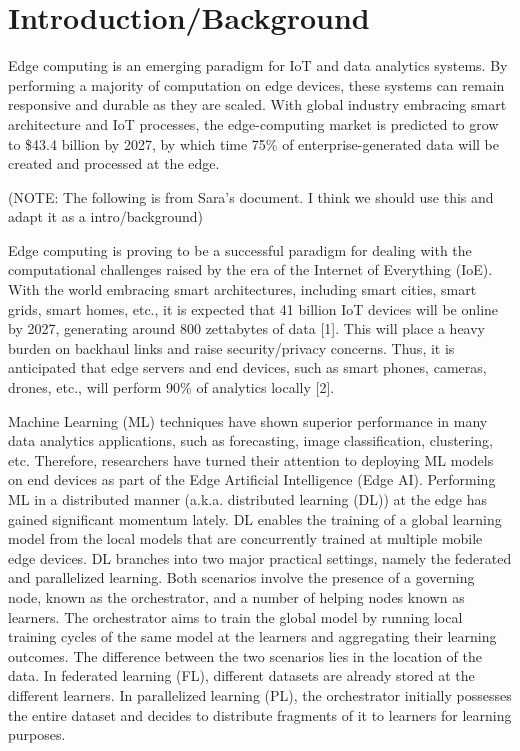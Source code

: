 \documentclass[../mthe-493-project-proposal.tex]{subfiles}
\begin{document}
    \chapter{Introduction/Background}
    \label{ch:introduction}
    
    Edge computing is an emerging paradigm for IoT and data analytics systems. By performing a majority of computation on edge devices, these systems can remain responsive and durable as they are scaled. With global industry embracing smart architecture and IoT processes, the edge-computing market is predicted to grow to \$43.4 billion by 2027, by which time 75\% of enterprise-generated data will be created and processed at the edge.
    
    (NOTE: The following is from Sara's document. I think we should use this and adapt it as a intro/background)~\cite{noauthor_edge_2020}
    
    Edge computing is proving to be a successful paradigm for dealing with the computational challenges raised by the era of the Internet of Everything (IoE). With the world embracing smart architectures, including smart cities, smart grids, smart homes, etc., it is expected that 41 billion IoT devices will be online by 2027, generating around 800 zettabytes of data [1]. This will place a heavy burden on backhaul links and raise security/privacy concerns. Thus, it is anticipated that edge servers and end devices, such as smart phones, cameras, drones, etc., will perform 90\% of analytics locally [2].
    
    Machine Learning (ML) techniques have shown superior performance in many data analytics applications, such as forecasting, image classification, clustering, etc. Therefore, researchers have turned their attention to deploying ML models on end devices as part of the Edge Artificial Intelligence (Edge AI). Performing ML in a distributed manner (a.k.a. distributed learning (DL)) at the edge has gained significant momentum lately. DL enables the training of a global learning model from the local models that are concurrently trained at multiple mobile edge devices. DL branches into two major practical settings, namely the federated and parallelized learning. Both scenarios involve the presence of a governing node, known as the orchestrator, and a number of helping nodes known as learners. The orchestrator aims to train the global model by running local training cycles of the same model at the learners and aggregating their learning outcomes. The difference between the two scenarios lies in the location of the data. In federated learning (FL), different datasets are already stored at the different learners. In parallelized learning (PL), the orchestrator initially possesses the entire dataset and decides to distribute fragments of it to learners for learning purposes.
    
\end{document}
